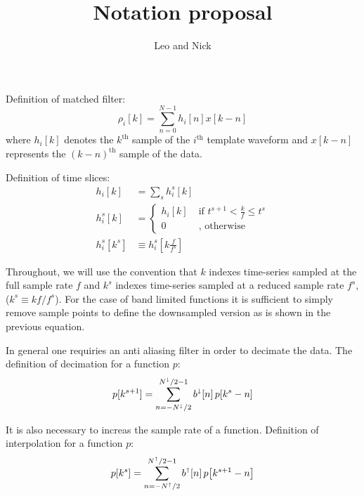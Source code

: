 \documentclass[letterpaper,11pt]{article}
\title{Notation proposal}
\author{Leo and Nick}
\begin{document}
\maketitle

Definition of matched filter:
\begin{equation}
\rho_i [k] = \sum_{n=0}^{N-1} h_{i}[n] x [k-n]
\end{equation}
where $h_i[k]$ denotes the $k^{\mathrm{th}}$ sample of the $i^{\mathrm{th}}$
template waveform and $x[k-n]$ represents the $(k-n)^{\mathrm{th}}$ sample of
the data.

Definition of time slices:
\begin{align}
h_{i}[k] &= \sum_s h_{i}^{s}[k] \\
h_{i}^{s}[k] &= \left\{ \begin{aligned}
    h_{i}[k] & \; \text{if } t^{s+1} < \frac{k}{f} \leq t^{s} \\
    0 & \; \text{, otherwise }
    \end{aligned} \right. \\
h_{i}^{s}[k^{s}] &\equiv h_{i}^{s}\!\left[k\frac{f}{f^{s}}\right]
\end{align}

Throughout, we will use the convention that $k$ indexes time-series sampled at
the full sample rate $f$ and $k^s$ indexes time-series sampled at a reduced
sample rate $f^s$, ($k^{s} \equiv k f / f^{s}$).  For the case of band limited
functions it is sufficient to simply remove sample points to define the
downsampled version as is shown in the previous equation.  

In general one requiries an anti aliasing filter in order to decimate the data.
The definition of decimation for a function $p$:
\begin{equation}
p[k^{s+1}] = \sum_{n=-N^\shortdownarrow/2}^{N^\shortdownarrow/2-1} b^\shortdownarrow[n] \, p\!\left[k^{s}-n\right]
\end{equation}

It is also necessary to increas the sample rate of a function.  Definition of
interpolation for a function $p$:
\begin{equation}
p[k^{s}] = \sum_{n=-N^\shortuparrow/2}^{N^\shortuparrow/2-1} b^\shortuparrow[n] \, p\!\left[k^{s+1}-n\right]
\end{equation}
\end{document}
